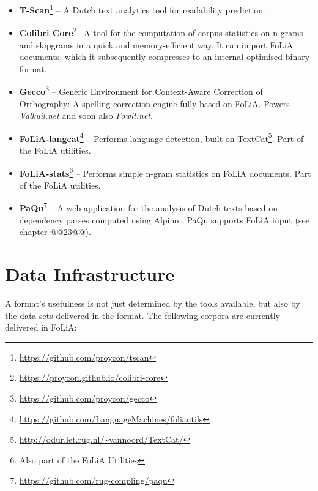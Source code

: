 \documentclass[a4paper,11pt]{article}
\begin{document}
\begin{itemize}
\item \textbf{\textbf{T-Scan}}\footnote{\url{https://github.com/proycon/tscan}} -- A Dutch text analytics tool for readability
    prediction  \cite{TSCAN}.
\item \textbf{\textbf{Colibri Core}}\footnote{\url{https://proycon.github.io/colibri-core}}-- A tool for the computation
    of corpus statistics on n-grams and skipgrams in a quick and
    memory-efficient way. It can import FoLiA documents, which it subsequently
    compresses to an internal optimised binary format.
\item \textbf{\textbf{Gecco}}\footnote{\url{https://github.com/proycon/gecco}}  -- Generic Environment for Context-Aware Correction
    of Orthography: A spelling correction engine fully based on FoLiA. Powers
    \emph{Valkuil.net} and soon also \emph{Fowlt.net}.
\item \textbf{\textbf{FoLiA-langcat}}\footnote{\url{https://github.com/LanguageMachines/foliautils}} -- Performs language detection, built on TextCat\footnote{\url{http://odur.let.rug.nl/~vannoord/TextCat/}}. Part of the FoLiA utilities.
\item \textbf{\textbf{FoLiA-stats}}\footnote{Also part of the FoLiA Utilities} -- Performs simple n-gram statistics on FoLiA documents. Part of the FoLiA utilities.
\item \textbf{\textbf{PaQu}}\footnote{\url{https://github.com/rug-compling/paqu}} -- A web application for the analysis
    of Dutch texts based on dependency parses computed using Alpino \cite{ALPINO}. PaQu supports FoLiA input (see
    chapter @@23@@).
\end{itemize}



\section{Data Infrastructure}
\label{sec:datainfrastructure}

A format's usefulness is not just determined by the tools
available, but also by the data sets delivered in the format.
The following corpora are currently delivered in FoLiA:
\end{document}

